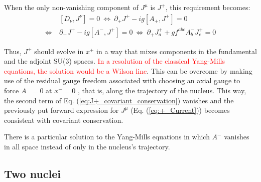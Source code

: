 When the only non-vanishing component of $J^\mu$ is $J^+$, this requirement becomes:
\begin{equation}
	\begin{split}
		& [D_\nu, J^\nu] = 0 ~ \Leftrightarrow ~ \partial_+ J^+ -ig [A_+, J^+] = 0 \\ \Leftrightarrow ~ & \partial_+ J^+ -ig [A^-, J^+] = 0 ~ \Leftrightarrow ~ \partial_+ J^+_a + g f^{abc}A^-_b J^+_c = 0
	\end{split}
	\label{eq:J+_covariant_conservation}
\end{equation}

Thus, $J^+$ should evolve in $x^+$ in a way that mixes components in the fundamental and the adjoint SU(3) spaces. \textcolor{red}{In a resolution of the classical Yang-Mills equations, the solution would be a Wilson line}. This can be overcome by making use of the residual gauge freedom associated with choosing an axial gauge to force $A^- = 0$ at $x^-=0$ \cite{Kovner_1995}, that is, along the trajectory of the nucleus. This way, the second term of Eq. (\ref{eq:J+_covariant_conservation}) vanishes and the previously put forward expression for $J^\mu$ (Eq. (\ref{eq:+_Current})) becomes consistent with covariant conservation.

There is a particular solution to the Yang-Mills equations in which $A^-$ vanishes in all space instead of only in the nucleus's trajectory. \cite{Kovner_1995}


\subsection{Two nuclei}


